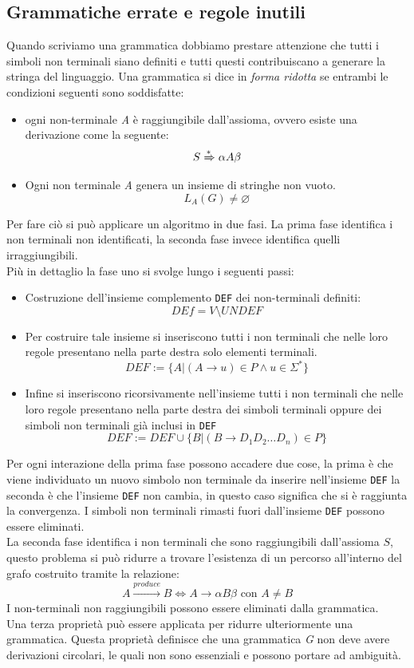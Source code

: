 \subsection{Grammatiche errate e regole inutili}
Quando scriviamo una grammatica dobbiamo prestare attenzione che tutti i simboli non terminali siano definiti e tutti questi contribuiscano a generare la stringa del linguaggio. 
Una grammatica si dice in \emph{forma ridotta} se entrambi le condizioni seguenti sono soddisfatte:
\begin{itemize}
\item ogni non-terminale \emph{A} è raggiungibile dall'assioma, ovvero esiste una derivazione come la seguente:
$$S \xRightarrow{*} \alpha A\beta$$
\item Ogni non terminale \emph{A} genera un insieme di stringhe non vuoto.
$$L_A(G) \neq \varnothing$$
\end{itemize}
Per fare ciò si può applicare un algoritmo in due fasi. La prima fase identifica i non terminali non identificati, la seconda fase invece identifica quelli irraggiungibili.\\
Più in dettaglio la fase uno si svolge lungo i seguenti passi:
\begin{itemize}
\item Costruzione dell'insieme complemento \texttt{DEF}	dei non-terminali definiti:
$$DEf = V\setminus UNDEF$$
\item Per costruire tale insieme si inseriscono tutti i non terminali che nelle loro regole presentano nella parte destra solo elementi terminali.
$$DEF:= \{A|(A\rightarrow u)\in P \wedge u\in \Sigma^* \}$$
\item Infine si inseriscono ricorsivamente nell'insieme tutti i non terminali che nelle loro regole presentano nella parte destra dei simboli terminali oppure dei simboli non terminali già inclusi in \texttt{DEF}
$$DEF:= DEF \cup \{B| (B\rightarrow D_1D_2\dots D_n)\in P \}$$
\end{itemize}
Per ogni interazione della prima fase possono accadere due cose, la prima è che viene individuato un nuovo simbolo non terminale da inserire nell'insieme \texttt{DEF} la seconda è che l'insieme \texttt{DEF} non cambia, in questo caso significa che si è raggiunta la convergenza. I simboli non terminali rimasti fuori dall'insieme \texttt{DEF} possono essere eliminati.\\
La seconda fase identifica i non terminali che sono raggiungibili dall'assioma $ S $, questo problema si può ridurre a trovare l'esistenza di un percorso all'interno del grafo costruito tramite la relazione:
$$A\xrightarrow{produce} B \iff A\rightarrow \alpha B\beta \text{ con } A\neq B$$
I non-terminali non raggiungibili possono essere eliminati dalla grammatica.\\
Una terza proprietà può essere applicata per ridurre ulteriormente una grammatica. Questa proprietà definisce che una grammatica \emph{G} non deve avere derivazioni circolari, le quali non sono essenziali e possono portare ad ambiguità.\\
